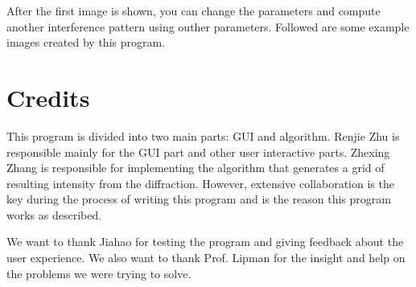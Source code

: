 \documentclass[12pt]{article}
\begin{document}
After the first image is shown, you can change the parameters
and compute another interference pattern using outher 
parameters. Followed are some example images created by
this program.



\section{Credits}

This program is divided into two main parts: GUI 
and algorithm. Renjie Zhu is responsible mainly for the 
GUI part and other user interactive parts. Zhexing Zhang 
is responsible for implementing the algorithm that 
generates a grid of resulting intensity from the diffraction.
However, extensive collaboration is the key during the
process of writing this program and is the reason this 
program works as described.

We want to thank Jiahao for testing the program 
and giving feedback about the user experience. We also
want to thank Prof. Lipman for the insight and help on the 
problems we were trying to solve.
\end{document}

